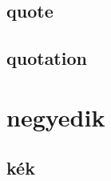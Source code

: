 \documentclass[twoside,twocolumn]{article}
\begin{document}
\subsection{quote}
\begin{quote}
\hulipsum[15-16]
\end{quote}

\subsection{quotation}
\begin{quotation}
\hulipsum[20-21]
\end{quotation}

\section{negyedik}
\begin{verse}
\hulipsum[100-101]
\end{verse}
\subsection{kék}
\end{document}
